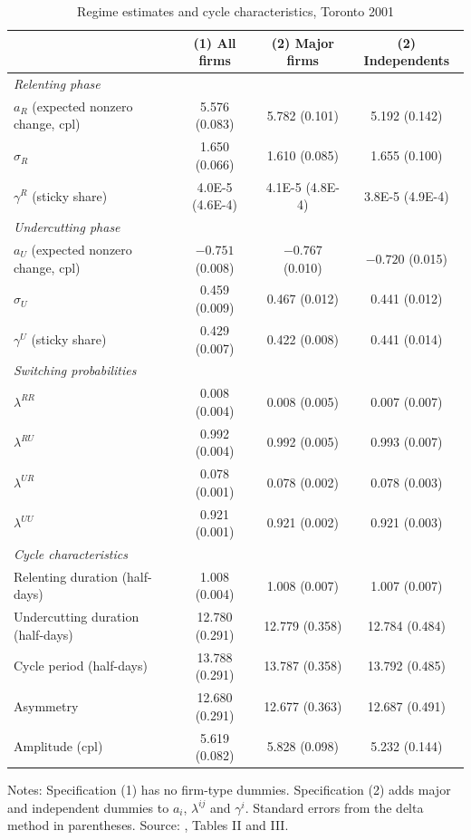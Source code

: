 \begin{table}[htbp]
\centering
\caption{Regime estimates and cycle characteristics, Toronto 2001}\label{tab:13-noel}
\small
\begin{tabular}{lccc}
\toprule
 & (1) All firms & (2) Major firms & (2) Independents\\
\midrule
\multicolumn{4}{l}{\textit{Relenting phase}}\\
$a_R$ (expected nonzero change, cpl) & 5.576 (0.083) & 5.782 (0.101) & 5.192 (0.142)\\
$\sigma_R$ & 1.650 (0.066) & 1.610 (0.085) & 1.655 (0.100)\\
$\gamma^R$ (sticky share) & 4.0E-5 (4.6E-4) & 4.1E-5 (4.8E-4) & 3.8E-5 (4.9E-4)\\
\multicolumn{4}{l}{\textit{Undercutting phase}}\\
$a_U$ (expected nonzero change, cpl) & $-0.751$ (0.008) & $-0.767$ (0.010) & $-0.720$ (0.015)\\
$\sigma_U$ & 0.459 (0.009) & 0.467 (0.012) & 0.441 (0.012)\\
$\gamma^U$ (sticky share) & 0.429 (0.007) & 0.422 (0.008) & 0.441 (0.014)\\
\multicolumn{4}{l}{\textit{Switching probabilities}}\\
$\lambda^{RR}$ & 0.008 (0.004) & 0.008 (0.005) & 0.007 (0.007)\\
$\lambda^{RU}$ & 0.992 (0.004) & 0.992 (0.005) & 0.993 (0.007)\\
$\lambda^{UR}$ & 0.078 (0.001) & 0.078 (0.002) & 0.078 (0.003)\\
$\lambda^{UU}$ & 0.921 (0.001) & 0.921 (0.002) & 0.921 (0.003)\\
\multicolumn{4}{l}{\textit{Cycle characteristics}}\\
Relenting duration (half-days) & 1.008 (0.004) & 1.008 (0.007) & 1.007 (0.007)\\
Undercutting duration (half-days) & 12.780 (0.291) & 12.779 (0.358) & 12.784 (0.484)\\
Cycle period (half-days) & 13.788 (0.291) & 13.787 (0.358) & 13.792 (0.485)\\
Asymmetry & 12.680 (0.291) & 12.677 (0.363) & 12.687 (0.491)\\
Amplitude (cpl) & 5.619 (0.082) & 5.828 (0.098) & 5.232 (0.144)\\
\bottomrule
\end{tabular}

\smallskip
\begin{minipage}{0.92\textwidth}\footnotesize
Notes: Specification (1) has no firm-type dummies. Specification (2) adds major and independent dummies to $a_i$,
$\lambda^{ij}$ and $\gamma^i$. Standard errors from the delta method in parentheses. Source: \citet{Noel2007},
Tables II and III.
\end{minipage}
\end{table}

